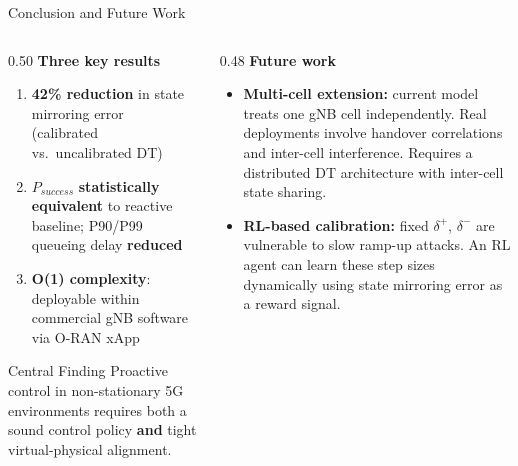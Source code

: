 \documentclass[aspectratio=169,t]{beamer}
\begin{document}
\begin{frame}{Conclusion and Future Work}

  \begin{columns}[T]
    \begin{column}{0.50\textwidth}
      \textbf{Three key results}

      \vspace{6pt}
      \begin{enumerate}\setlength\itemsep{6pt}
        \item \textbf{42\% reduction} in state mirroring error\\
              (calibrated vs.\ uncalibrated DT)

        \item $P_{success}$ \textbf{statistically equivalent} to reactive baseline;
              P90/P99 queueing delay \textbf{reduced}

        \item \textbf{O(1) complexity}: deployable within commercial gNB software via O-RAN xApp
      \end{enumerate}

      \vspace{8pt}
      \begin{exampleblock}{\small Central Finding}
        \small
        Proactive control in non-stationary 5G environments requires both a
        sound control policy \textbf{and} tight virtual-physical alignment.
      \end{exampleblock}
    \end{column}

    \begin{column}{0.48\textwidth}
      \textbf{Future work}

      \vspace{6pt}
      \begin{itemize}\setlength\itemsep{8pt}
        \item \textbf{Multi-cell extension:} current model treats one gNB cell independently.
              Real deployments involve handover correlations and inter-cell interference.
              Requires a distributed DT architecture with inter-cell state sharing.

        \item \textbf{RL-based calibration:} fixed $\delta^{+}$, $\delta^{-}$ are vulnerable to
              slow ramp-up attacks. An RL agent can learn these step sizes dynamically using
              state mirroring error as a reward signal.
      \end{itemize}
    \end{column}
  \end{columns}

\end{frame}
\end{document}

